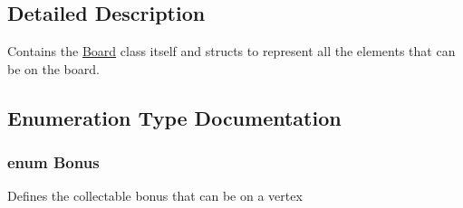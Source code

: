 \subsection{Detailed Description}
Contains the \hyperlink{classBoard}{Board} class itself and structs to represent all the elements that can be on the board. 

\subsection{Enumeration Type Documentation}
\subsubsection[{\texorpdfstring{Bonus}{Bonus}}]{\setlength{\rightskip}{0pt plus 5cm}enum {\bf Bonus}}\hypertarget{Board_8hh_a89fd84d2116e79c08d57dffb6d167ec2}{}\label{Board_8hh_a89fd84d2116e79c08d57dffb6d167ec2}
Defines the collectable bonus that can be on a vertex 